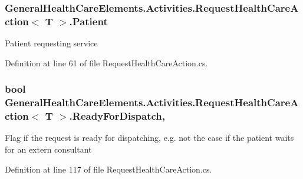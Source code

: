 \subsubsection[{\texorpdfstring{Patient}{Patient}}]{ {\bf General\+Health\+Care\+Elements.\+Activities.\+Request\+Health\+Care\+Action}$<$ T $>$.Patient\hspace{0.3cm}{\ttfamily [get]}}\hypertarget{class_general_health_care_elements_1_1_activities_1_1_request_health_care_action_a3e8a540d0d49ee819f3bba4dc0bc3388}{}\label{class_general_health_care_elements_1_1_activities_1_1_request_health_care_action_a3e8a540d0d49ee819f3bba4dc0bc3388}


Patient requesting service 



Definition at line 61 of file Request\+Health\+Care\+Action.\+cs.

\subsubsection[{\texorpdfstring{Ready\+For\+Dispatch}{ReadyForDispatch}}]{\setlength{\rightskip}{0pt plus 5cm}bool {\bf General\+Health\+Care\+Elements.\+Activities.\+Request\+Health\+Care\+Action}$<$ T $>$.Ready\+For\+Dispatch\hspace{0.3cm}{\ttfamily [get]}, {\ttfamily [set]}}\hypertarget{class_general_health_care_elements_1_1_activities_1_1_request_health_care_action_a70deb64e3122d0f5c0ffa523b3fb8643}{}\label{class_general_health_care_elements_1_1_activities_1_1_request_health_care_action_a70deb64e3122d0f5c0ffa523b3fb8643}


Flag if the request is ready for dispatching, e.\+g. not the case if the patient waits for an extern consultant 



Definition at line 117 of file Request\+Health\+Care\+Action.\+cs.

